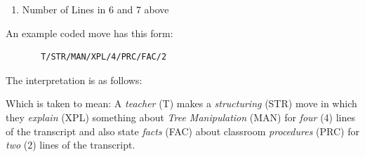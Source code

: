 \documentclass[conference]{IEEEtran}
\begin{document}
\begin{enumerate}
\item {Number of Lines in 6 and 7 above}
\end{enumerate}

An example coded move has this form:
\begin{verbatim}
       T/STR/MAN/XPL/4/PRC/FAC/2
\end{verbatim}

The interpretation is as follows:

Which is taken to mean: A \emph{teacher} (T) makes a \emph{structuring} (STR) move
in which they \emph{explain} (XPL) something about \emph{Tree Manipulation} (MAN) for
\emph{four} (4) lines of the transcript and also state \emph{facts} (FAC) about
classroom \emph{procedures} (PRC) for \emph{two} (2) lines of the transcript.
\end{document}

